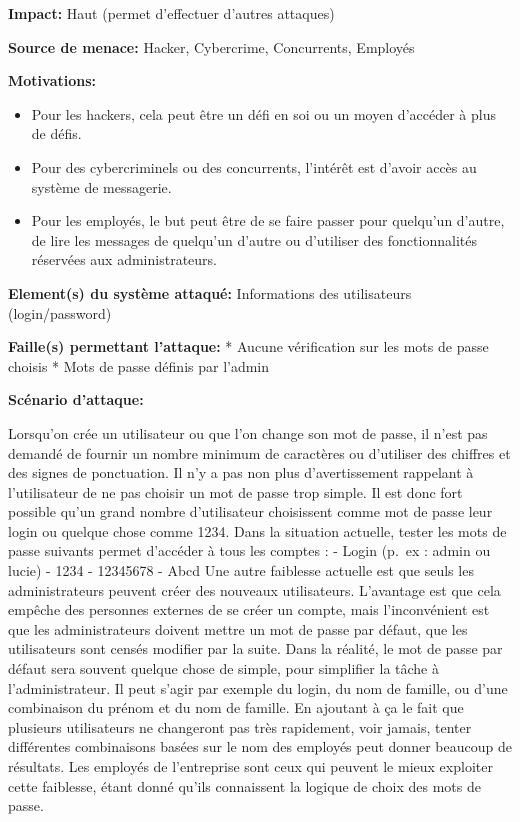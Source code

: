 \documentclass{article}
\begin{document}
\textbf{Impact:} Haut (permet d'effectuer d'autres attaques)

\textbf{Source de menace:} Hacker, Cybercrime, Concurrents, Employés

\textbf{Motivations:}

\begin{itemize}

\item
  Pour les hackers, cela peut être un défi en soi ou un moyen d'accéder
  à plus de défis.
\item
  Pour des cybercriminels ou des concurrents, l'intérêt est d'avoir
  accès au système de messagerie.
\item
  Pour les employés, le but peut être de se faire passer pour quelqu'un
  d'autre, de lire les messages de quelqu'un d'autre ou d'utiliser des
  fonctionnalités réservées aux administrateurs.
\end{itemize}

\textbf{Element(s) du système attaqué:} Informations des utilisateurs
(login/password)

\textbf{Faille(s) permettant l'attaque:} * Aucune vérification sur les
mots de passe choisis * Mots de passe définis par l'admin

\textbf{Scénario d'attaque:}

Lorsqu'on crée un utilisateur ou que l'on change son mot de passe, il
n'est pas demandé de fournir un nombre minimum de caractères ou
d'utiliser des chiffres et des signes de ponctuation. Il n'y a pas non
plus d'avertissement rappelant à l'utilisateur de ne pas choisir un mot
de passe trop simple. Il est donc fort possible qu'un grand nombre
d'utilisateur choisissent comme mot de passe leur login ou quelque chose
comme 1234. Dans la situation actuelle, tester les mots de passe
suivants permet d'accéder à tous les comptes : - Login (p.~ex : admin ou
lucie) - 1234 - 12345678 - Abcd Une autre faiblesse actuelle est que
seuls les administrateurs peuvent créer des nouveaux utilisateurs.
L'avantage est que cela empêche des personnes externes de se créer un
compte, mais l'inconvénient est que les administrateurs doivent mettre
un mot de passe par défaut, que les utilisateurs sont censés modifier
par la suite. Dans la réalité, le mot de passe par défaut sera souvent
quelque chose de simple, pour simplifier la tâche à l'administrateur. Il
peut s'agir par exemple du login, du nom de famille, ou d'une
combinaison du prénom et du nom de famille. En ajoutant à ça le fait que
plusieurs utilisateurs ne changeront pas très rapidement, voir jamais,
tenter différentes combinaisons basées sur le nom des employés peut
donner beaucoup de résultats. Les employés de l'entreprise sont ceux qui
peuvent le mieux exploiter cette faiblesse, étant donné qu'ils
connaissent la logique de choix des mots de passe.
\end{document}
